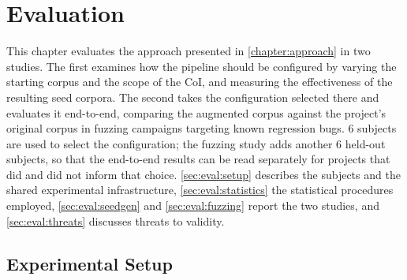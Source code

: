 
\newcommand{\researchq}[1]{%
  \textbf{RQ~#1}\label{rq:#1}%
}

\newcommand{\rqref}[1]{%
  \hyperref[rq:#1]{RQ\textsubscript{#1}}%
}

\newcommand{\Mdn}{\mathrm{Mdn}}
\newcommand{\dMdn}{\Delta\mathrm{Mdn}}

\chapter{Evaluation}\label{chapter:evaluation}
This chapter evaluates the approach presented in \autoref{chapter:approach} in two studies.
The first examines how the pipeline should be configured by varying the starting corpus and the scope of the \ac{CoI}, and measuring the effectiveness of the resulting seed corpora.
The second takes the configuration selected there and evaluates it end-to-end, comparing the augmented corpus against the project's original corpus in fuzzing campaigns targeting known regression bugs.
\num{6} subjects are used to select the configuration; the fuzzing study adds another \num{6} held-out subjects, so that the end-to-end results can be read separately for projects that did and did not inform that choice.
\autoref{sec:eval:setup} describes the subjects and the shared experimental infrastructure, \autoref{sec:eval:statistics} the statistical procedures employed, \autoref{sec:eval:seedgen} and \autoref{sec:eval:fuzzing} report the two studies, and \autoref{sec:eval:threats} discusses threats to validity.

\section{Experimental Setup}\label{sec:eval:setup}

